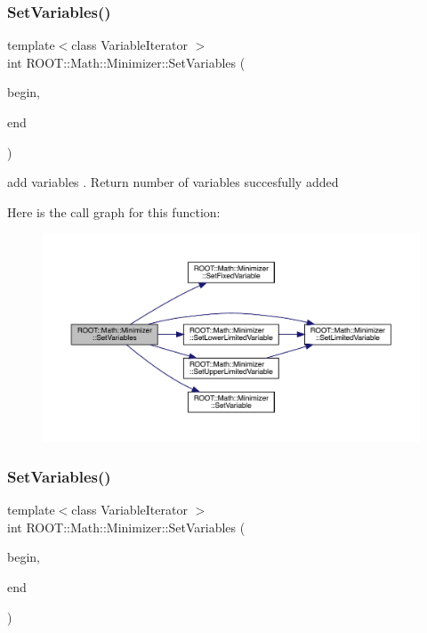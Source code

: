 \subsubsection{\texorpdfstring{SetVariables()}{SetVariables()}\hspace{0.1cm}{\footnotesize\ttfamily [2/3]}}
{\footnotesize\ttfamily template$<$class Variable\+Iterator $>$ \\
int R\+O\+O\+T\+::\+Math\+::\+Minimizer\+::\+Set\+Variables (\begin{DoxyParamCaption}\item[{const Variable\+Iterator \&}]{begin,  }\item[{const Variable\+Iterator \&}]{end }\end{DoxyParamCaption})\hspace{0.3cm}{\ttfamily [inline]}}



add variables . Return number of variables succesfully added 

Here is the call graph for this function\+:
\nopagebreak
\begin{figure}[H]
\begin{center}
\leavevmode
\includegraphics[width=350pt]{dc/dc4/classROOT_1_1Math_1_1Minimizer_a314040274ee907fba52726275a28c9f7_cgraph}
\end{center}
\end{figure}
\mbox{\label{classROOT_1_1Math_1_1Minimizer_a314040274ee907fba52726275a28c9f7}} 
\subsubsection{\texorpdfstring{SetVariables()}{SetVariables()}\hspace{0.1cm}{\footnotesize\ttfamily [3/3]}}
{\footnotesize\ttfamily template$<$class Variable\+Iterator $>$ \\
int R\+O\+O\+T\+::\+Math\+::\+Minimizer\+::\+Set\+Variables (\begin{DoxyParamCaption}\item[{const Variable\+Iterator \&}]{begin,  }\item[{const Variable\+Iterator \&}]{end }\end{DoxyParamCaption})\hspace{0.3cm}{\ttfamily [inline]}}



